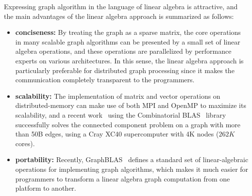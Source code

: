 \documentclass{sokendai_thesis} %
\begin{document}
Expressing graph algorithm in the language of linear algebra is attractive, and the main advantages of the linear algebra approach is summarized as follows:
\begin{itemize}
  \item \textbf{conciseness:}
    By treating the graph as a sparse matrix, the core operations in many scalable graph algorithms can be presented by a small set of linear algebra operations, and these operations are parallelized by performance experts on various architectures.
    In this sense, the linear algebra approach is particularly preferable for distributed graph processing since it makes the communication completely transparent to the programmers.

  \item \textbf{scalability:}
    The implementation of matrix and vector operations on distributed-memory can make use of both MPI and OpenMP to maximize its scalability, and a recent work~\cite{lacc} using the Combinatorial BLAS~\cite{combblas} library successfully solves the connected component problem on a graph with more than 50B edges, using a Cray XC40 supercomputer with 4K nodes ($262K$ cores).

  \item \textbf{portability:}
    Recently, GraphBLAS~\cite{graphblas} defines a standard set of linear-algebraic operations for implementing graph algorithms, which makes it much easier for programmers to transform a linear algebra graph computation from one platform to another.

\end{itemize}


\end{document}
